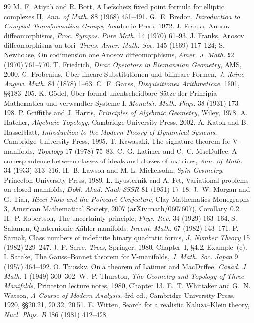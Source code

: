 \documentclass[11pt,a4paper]{article}
\theoremstyle{plain}
\theoremstyle{definition}
\theoremstyle{remark}
\begin{document}
\begin{thebibliography}{99}
 M.~F. Atiyah and R. Bott, A Lefschetz fixed point formula for elliptic complexes II, \emph{Ann. of Math.} 88 (1968) 451--491.
 G.~E. Bredon, \emph{Introduction to Compact Transformation Groups}, Academic Press, 1972.
 J. Franks, Anosov diffeomorphisms, \emph{Proc. Sympos. Pure Math.} 14 (1970) 61--93.
 J. Franks, Anosov diffeomorphisms on tori, \emph{Trans. Amer. Math. Soc.} 145 (1969) 117--124; S. Newhouse, On codimension one Anosov diffeomorphisms, \emph{Amer. J. Math.} 92 (1970) 761--770.
 T. Friedrich, \emph{Dirac Operators in Riemannian Geometry}, AMS, 2000.
 G. Frobenius, \"Uber lineare Substitutionen und bilineare Formen, \emph{J. Reine Angew. Math.} 84 (1878) 1--63.
 C.~F. Gauss, \emph{Disquisitiones Arithmeticae}, 1801, \S\S183--205.
 K. G\"odel, \"Uber formal unentscheidbare S\"atze der Principia Mathematica und verwandter Systeme I, \emph{Monatsh. Math. Phys.} 38 (1931) 173--198.
 P. Griffiths and J. Harris, \emph{Principles of Algebraic Geometry}, Wiley, 1978.
 A. Hatcher, \emph{Algebraic Topology}, Cambridge University Press, 2002.
 A. Katok and B. Hasselblatt, \emph{Introduction to the Modern Theory of Dynamical Systems}, Cambridge University Press, 1995.
 T. Kawasaki, The signature theorem for V-manifolds, \emph{Topology} 17 (1978) 75--83.
 C.~G. Latimer and C.~C. MacDuffee, A correspondence between classes of ideals and classes of matrices, \emph{Ann. of Math.} 34 (1933) 313--316.
 H.~B. Lawson and M.-L. Michelsohn, \emph{Spin Geometry}, Princeton University Press, 1989.
 L. Lyusternik and A. Fet, Variational problems on closed manifolds, \emph{Dokl. Akad. Nauk SSSR} 81 (1951) 17--18.
 J.~W. Morgan and G. Tian, \emph{Ricci Flow and the Poincar\'e Conjecture}, Clay Mathematics Monographs 3, American Mathematical Society, 2007 (arXiv:math/0607607), Corollary~0.2.
 H.~P. Robertson, The uncertainty principle, \emph{Phys. Rev.} 34 (1929) 163--164.
 S. Salamon, Quaternionic K\"ahler manifolds, \emph{Invent. Math.} 67 (1982) 143--171.
 P. Sarnak, Class numbers of indefinite binary quadratic forms, \emph{J. Number Theory} 15 (1982) 229--247.
 J.-P. Serre, \emph{Trees}, Springer, 1980, Chapter~I, \S4.2, Example~(c).
 I. Satake, The Gauss--Bonnet theorem for V-manifolds, \emph{J. Math. Soc. Japan} 9 (1957) 464--492.
 O. Taussky, On a theorem of Latimer and MacDuffee, \emph{Canad. J. Math.} 1 (1949) 300--302.
 W.~P. Thurston, \emph{The Geometry and Topology of Three-Manifolds}, Princeton lecture notes, 1980, Chapter 13.
 E.~T. Whittaker and G.~N. Watson, \emph{A Course of Modern Analysis}, 3rd ed., Cambridge University Press, 1920, \S\S20.21, 20.32, 20.51.
 E. Witten, Search for a realistic Kaluza--Klein theory, \emph{Nucl. Phys. B} 186 (1981) 412--428.
\end{thebibliography}
\end{document}
